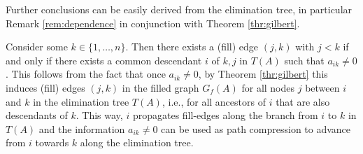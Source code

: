 Further conclusions can be easily derived
from the elimination tree, in particular
Remark   \ref{rem:dependence} in conjunction with Theorem \ref{thr:gilbert}.
\begin{remark}\label{rem:path-compression}
Consider some $k\in\{1,\dots,n\}$. Then there exists a (fill) edge $(j,k)$
with $j<k$ if and only if there exists a common
descendant $i$ of $k,j$ in $T(A)$ such that $a_{ik}\not=0$.
This follows from the fact that once $a_{ik}\not=0$, by Theorem \ref{thr:gilbert}
this induces (fill) edges $(j,k)$ in the filled graph $G_f(A)$ for all nodes
$j$ between $i$ and $k$ in the elimination tree $T(A)$, i.e., for all ancestors
of $i$ that are also descendants of $k$. This way, $i$ propagates fill-edges
along the branch from $i$ to $k$ in $T(A)$ and the information $a_{ik}\not=0$ can be
used as path compression to advance from $i$ towards $k$ along the elimination
tree.
\end{remark}
%
%
%
